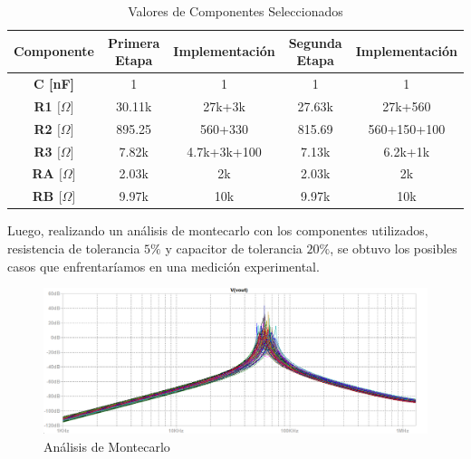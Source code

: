 \begin{table}[H]
\centering
\begin{tabular}{@{}ccccc@{}}
\toprule
\textbf{Componente}                     & \textbf{Primera Etapa} & \textbf{Implementación} & \textbf{Segunda Etapa} & \textbf{Implementación} \\ \midrule
\textbf{C {[}nF{]}}                     & 1                      & 1                       & 1                      & 1                       \\
\textbf{R1 ${[}\Omega{]}$} & 30.11k                 & 27k+3k                  & 27.63k                 & 27k+560                 \\
\textbf{R2 ${[}\Omega{]}$} & 895.25                 & 560+330                 & 815.69                 & 560+150+100             \\
\textbf{R3 ${[}\Omega{]}$} & 7.82k                  & 4.7k+3k+100             & 7.13k                  & 6.2k+1k                 \\
\textbf{RA ${[}\Omega{]}$} & 2.03k                  & 2k                      & 2.03k                  & 2k                      \\
\textbf{RB ${[}\Omega{]}$} & 9.97k                  & 10k                     & 9.97k                  & 10k                     \\ \bottomrule
\end{tabular}
\label{ej22tvalr}
\caption{Valores de Componentes Seleccionados}
\end{table}

Luego, realizando un análisis de montecarlo con los componentes utilizados, resistencia de tolerancia $5\%$ y capacitor de tolerancia $20\%$, se obtuvo los posibles casos que enfrentaríamos en una medición experimental.

\begin{figure}[H]
    \centering
    \includegraphics[scale = 0.65]{../Ejercicio2-DisenoDeCeldas/2CELDARAUCH/Informe/monte.PNG}
    \caption{Análisis de Montecarlo}
    \label{ej22monteall}
\end{figure}

